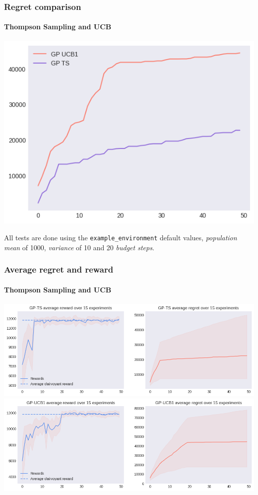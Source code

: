 \begin{frame}[plain]

\frametitle{Regret comparison}
\framesubtitle{Thompson Sampling and UCB}

\begin{center}
	\includegraphics[scale=0.5]{img/Graphs/uncertain_alpha/image3.png}
\end{center}

\scriptsize All tests are done using the \texttt{example\_environment} default values, \textit{population mean} of 1000, \textit{variance} of 10 and 20 \textit{budget steps}.

\end{frame}


\begin{frame}[plain]

\frametitle{Average regret and reward}
\framesubtitle{Thompson Sampling and UCB}

\begin{center}
	\includegraphics[scale=0.4]{img/Graphs/uncertain_alpha/image4.png}
	\includegraphics[scale=0.4]{img/Graphs/uncertain_alpha/image5.png}
\end{center}

\end{frame}

